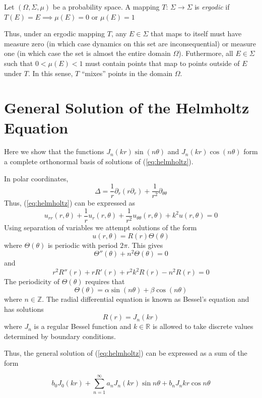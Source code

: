 \documentclass{report}
\begin{document}
\begin{dfn}[Ergodicity]
Let $(\Omega, \Sigma, \mu)$ be a probability space. A mapping $T$: $\Sigma \rightarrow \Sigma$ is \emph{ergodic} if $T(E) = E \implies \mu(E) = 0$ or $\mu(E) = 1$
\end{dfn}

Thus, under an ergodic mapping $T$, any $E \in \Sigma$ that maps to itself must have measure zero (in which case dynamics on this set are inconsequential) or measure one (in which case the set is almost the entire domain $\Omega$). Futhermore, all $E \in \Sigma$ such that $0 < \mu(E) < 1$ must contain points that map to points outside of $E$ under $T$. In this sense, $T$ ``mixes'' points in the domain $\Omega$.

\chapter{General Solution of the Helmholtz Equation}
\label{sec:helmholtz_basis}
Here we show that the functions $J_{n}(k r) \sin(n \theta)$ and $J_{n}(k r) \cos(n \theta)$ form a complete orthonormal basis of solutions of (\ref{eq:helmholtz}).

In polar coordinates,
\[
\Delta = \frac{1}{r} \partial_{r} (r \partial_{r}) + \frac{1}{r^{2}} \partial_{\theta \theta}
\]
Thus, (\ref{eq:helmholtz}) can be expressed as
\[
u_{rr}(r, \theta) + \frac{1}{r} u_{r}(r, \theta) + \frac{1}{r^{2}} u_{\theta \theta}(r, \theta) + k^2 u(r, \theta) = 0
\]
Using separation of variables we attempt solutions of the form
\[
u(r, \theta) = R(r) \Theta(\theta)
\]
where $\Theta(\theta)$ is periodic with period $2 \pi$. This gives
\[
\Theta''(\theta) + n^{2} \Theta(\theta) = 0
\]
and
\[
r^{2} R''(r) + r R'(r) + r^{2} k^{2} R(r) - n^{2} R(r) = 0
\]
The periodicity of $\Theta(\theta)$ requires that
\[
\Theta(\theta) = \alpha \sin(n \theta) + \beta \cos(n \theta)
\]
where $n \in \mathbb{Z}$.
The radial differential equation is known as Bessel's equation and has solutions
\[
R(r) = J_{n}(k r)
\]
where $J_{n}$ is a regular Bessel function and $k \in \mathbb{R}$ is allowed to take discrete values determined by boundary conditions.

Thus, the general solution of (\ref{eq:helmholtz}) can be expressed as a sum of the form

\begin{equation}
  \label{eq:helmholtz_gen_soln}
  b_{0} J_{0}(kr) + \sum_{n = 1}^{\infty}{a_{n} J_n(kr) \sin{n \theta} + b_{n} J_n{kr} \cos{n \theta}}
\end{equation}
\end{document}
